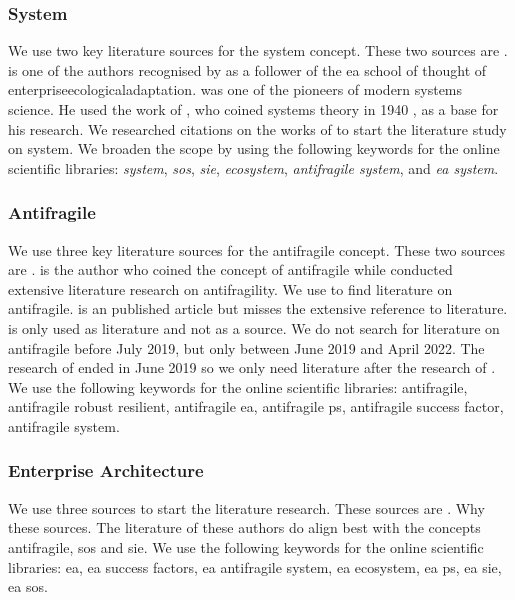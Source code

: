 \subsubsection{System}
\label{subsub:system}
We use two key literature sources for the system concept. These two sources are \textcites{Ackoff1973}{Gharajedaghi2011}. \textcite{Gharajedaghi2011} is one of the authors recognised by \textcite{Lapalme2012} as a follower of the \acrlong{ea} school of thought of \gls{enterpriseecologicaladaptation}. \textcite{Ackoff1973} was one of the pioneers of modern systems science. He used the work of  \textcite{Bertalanffy1968}, who coined systems theory in 1940 \parencite{Systemstheory2022}, as a base for his research. We researched citations on the works of \textcites{Ackoff1973}{Gharajedaghi2011} to start the literature study on system. We broaden the scope by using the following keywords for the online scientific libraries: \textit{system}, \textit{\gls{sos}}, \textit{\gls{sie}}, \textit{ecosystem}, \textit{\gls{antifragile} system}, and \textit{\acrlong{ea} system}.

\subsubsection{Antifragile}
\label{subsub:antifragile}
We use three key literature sources for the \gls{antifragile} concept. These two sources are \textcites{Taleb2012}{Botjes2020}{Botjes2021}. \textcite{Taleb2012} is the author who coined the concept of \gls{antifragile} while \textcite{Botjes2020} conducted extensive literature research on \gls{antifragility}. We use \textcite{Botjes2020} to find literature on antifragile. \textcite{Botjes2021} is an published article but misses the extensive reference to literature. \textcite{Botjes2021} is only used as literature and not as a source. We do not search for literature on \gls{antifragile} before July 2019, but only between June 2019 and April 2022. The research of \textcite{Botjes2020} ended in June 2019 so we only need literature after the research of \textcite{Botjes2020}. We use the following keywords for the online scientific libraries: \gls{antifragile}, \gls{antifragile} \gls{robust} \gls{resilient}, \gls{antifragile} \acrlong{ea}, \gls{antifragile} \gls{ps}, \gls{antifragile} success factor, \gls{antifragile} system.

\subsubsection{Enterprise Architecture}
\label{subsub:enterprisearchitecture}
We use three sources to start the literature research. These sources are \textcites{Graves2008}{Hoogervorst2009}{Lapalme2012b}. Why these sources. The literature of these authors do align best with the concepts \gls{antifragile}, \gls{sos} and \gls{sie}. We use the following keywords for the online scientific libraries: \acrlong{ea}, \acrlong{ea} success factors, \acrlong{ea} \gls{antifragile} system, \acrlong{ea} ecosystem, \acrlong{ea} \gls{ps}, \acrlong{ea} \gls{sie}, \acrlong{ea} \gls{sos}.

